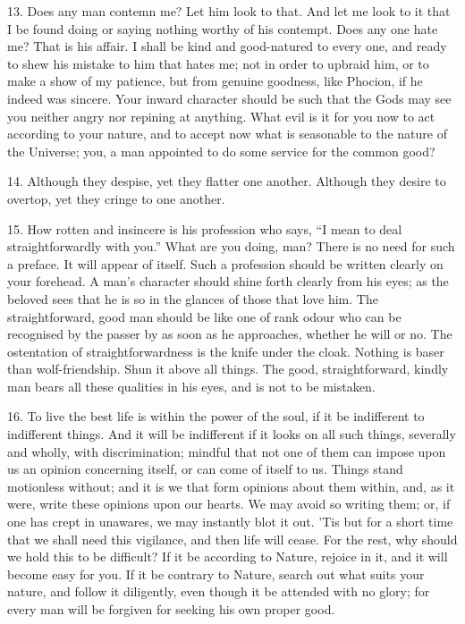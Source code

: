 \documentclass{book}
\begin{document}
13. Does any man contemn me? Let him look to that. And let me look to
it that I be found doing or saying nothing worthy of his
contempt. Does any one hate me? That is his affair. I shall be kind
and good-natured to every one, and ready to shew his mistake to him
that hates me; not in order to upbraid him, or to make a show of my
patience, but from genuine goodness, like Phocion, if he indeed was
sincere. Your inward character should be such that the Gods may see
you neither angry nor repining at anything. What evil is it for you
now to act according to your nature, and to accept now what is
seasonable to the nature of the Universe; you, a man appointed to do
some service for the common good?

14. Although they despise, yet they flatter one another. Although they
desire to overtop, yet they cringe to one another.

15. How rotten and insincere is his profession who says, ``I mean to
deal straightforwardly with you.'' What are you doing, man? There is no
need for such a preface. It will appear of itself. Such a profession
should be written clearly on your forehead. A man's character should
shine forth clearly from his eyes; as the beloved sees that he is so
in the glances of those that love him. The straightforward, good man
should be like one of rank odour who can be recognised by the passer
by as soon as he approaches, whether he will or no. The ostentation of
straightforwardness is the knife under the cloak. Nothing is baser
than wolf-friendship. Shun it above all things. The good,
straightforward, kindly man bears all these qualities in his eyes, and
is not to be mistaken.

16. To live the best life is within the power of the soul, if it be
indifferent to indifferent things. And it will be indifferent if it
looks on all such things, severally and wholly, with discrimination;
mindful that not one of them can impose upon us an opinion concerning
itself, or can come of itself to us. Things stand motionless without;
and it is we that form opinions about them within, and, as it were,
write these opinions upon our hearts. We may avoid so writing them;
or, if one has crept in unawares, we may instantly blot it out. 'Tis
but for a short time that we shall need this vigilance, and then life
will cease. For the rest, why should we hold this to be difficult? If
it be according to Nature, rejoice in it, and it will become easy for
you. If it be contrary to Nature, search out what suits your nature,
and follow it diligently, even though it be attended with no glory;
for every man will be forgiven for seeking his own proper good.
\end{document}
